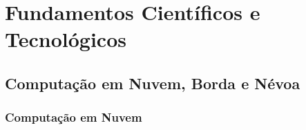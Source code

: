\chapter{Fundamentos Científicos e Tecnológicos}
\label{cha:fundamentos}


\section{Computação em Nuvem, Borda e Névoa}





\subsection{Computação em Nuvem}

